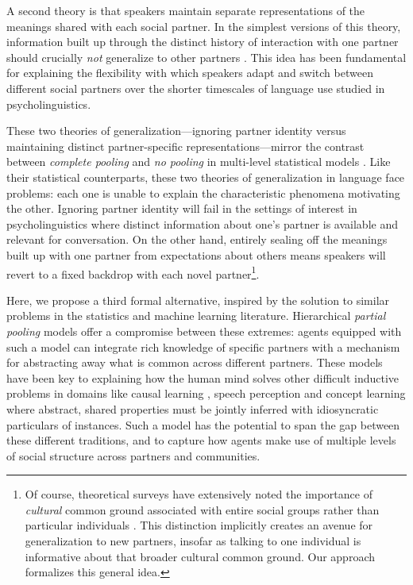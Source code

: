 A second theory is that speakers maintain separate representations of the meanings shared with each social partner. 
In the simplest versions of this theory, information built up through the distinct history of interaction with one partner should crucially \emph{not} generalize to other partners \cite{clark_using_1996,brennan_partner-specific_2009,horton_revisiting_2016}.
This idea has been fundamental for explaining the flexibility with which speakers adapt and switch between different social partners \cite{ClarkWilkesGibbs86_ReferringCollaborative,MetzingBrennan03_PartnerSpecificPacts} over the shorter timescales of language use studied in psycholinguistics.

These two theories of generalization---ignoring partner identity versus maintaining distinct partner-specific representations---mirror the contrast between \emph{complete pooling} and \emph{no pooling} in multi-level statistical models \cite{gelman2006data}. 
Like their statistical counterparts, these two theories of generalization in language face problems: each one is unable to explain the characteristic phenomena motivating the other. 
Ignoring partner identity will fail in the settings of interest in psycholinguistics where distinct information about one’s partner is available and relevant for conversation. 
On the other hand, entirely sealing off the meanings built up with one partner from expectations about others means speakers will revert to a fixed backdrop with each novel partner\footnote{Of course, theoretical surveys have extensively noted the importance of \emph{cultural} common ground associated with entire social groups rather than particular individuals \cite[e.g.]{Clark98_CommunalLexicons}. This distinction implicitly creates an avenue for generalization to new partners, insofar as talking to one individual is informative about that broader cultural common ground. Our approach formalizes this general idea.}.

Here, we propose a third formal alternative, inspired by the solution to similar problems in the statistics and machine learning literature.
Hierarchical \emph{partial pooling} models offer a compromise between these extremes: agents equipped with such a model can integrate rich knowledge of specific partners with a mechanism for abstracting away what is common across different partners.
These models have been key to explaining how the human mind solves other difficult inductive problems in domains like causal learning \cite{KempGoodmanTenenbaum10_LearningToLearn,GoodmanUllmanTenenbaum11_TheoryOfCausality}, speech perception \cite{KleinschmidtJaeger15_RobustSpeechPerception} and concept learning \cite{KempPerforsTenenbaum07_HBM} where abstract, shared properties must be jointly inferred with idiosyncratic particulars of instances. 
Such a model has the potential to span the gap between these different traditions, and to capture how agents make use of multiple levels of social structure across partners and communities. 

